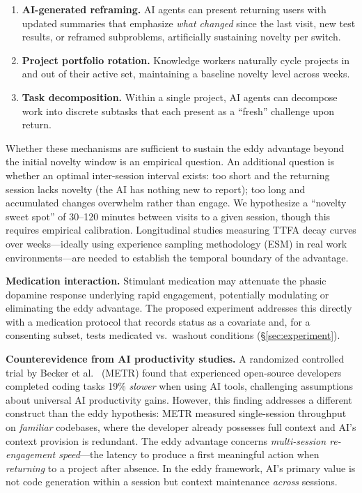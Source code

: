 \documentclass[sigconf,nonacm]{acmart}
\begin{document}
\begin{enumerate}
\item \textbf{AI-generated reframing.} AI agents can present returning users with updated summaries that emphasize \emph{what changed} since the last visit, new test results, or reframed subproblems, artificially sustaining novelty per switch.

\item \textbf{Project portfolio rotation.} Knowledge workers naturally cycle projects in and out of their active set, maintaining a baseline novelty level across weeks.

\item \textbf{Task decomposition.} Within a single project, AI agents can decompose work into discrete subtasks that each present as a ``fresh'' challenge upon return.
\end{enumerate}

Whether these mechanisms are sufficient to sustain the eddy advantage beyond the initial novelty window is an empirical question. An additional question is whether an optimal inter-session interval exists: too short and the returning session lacks novelty (the AI has nothing new to report); too long and accumulated changes overwhelm rather than engage. We hypothesize a ``novelty sweet spot'' of 30--120 minutes between visits to a given session, though this requires empirical calibration. Longitudinal studies measuring TTFA decay curves over weeks---ideally using experience sampling methodology (ESM) in real work environments---are needed to establish the temporal boundary of the advantage.

\textbf{Medication interaction.} Stimulant medication may attenuate the phasic dopamine response underlying rapid engagement, potentially modulating or eliminating the eddy advantage. The proposed experiment addresses this directly with a medication protocol that records status as a covariate and, for a consenting subset, tests medicated vs.\ washout conditions (\S\ref{sec:experiment}).

\textbf{Counterevidence from AI productivity studies.} A randomized controlled trial by Becker et al.~\cite{metr2025} (METR) found that experienced open-source developers completed coding tasks 19\% \emph{slower} when using AI tools, challenging assumptions about universal AI productivity gains. However, this finding addresses a different construct than the eddy hypothesis: METR measured single-session throughput on \emph{familiar} codebases, where the developer already possesses full context and AI's context provision is redundant. The eddy advantage concerns \emph{multi-session re-engagement speed}---the latency to produce a first meaningful action when \emph{returning} to a project after absence. In the eddy framework, AI's primary value is not code generation within a session but context maintenance \emph{across} sessions.
\end{document}
